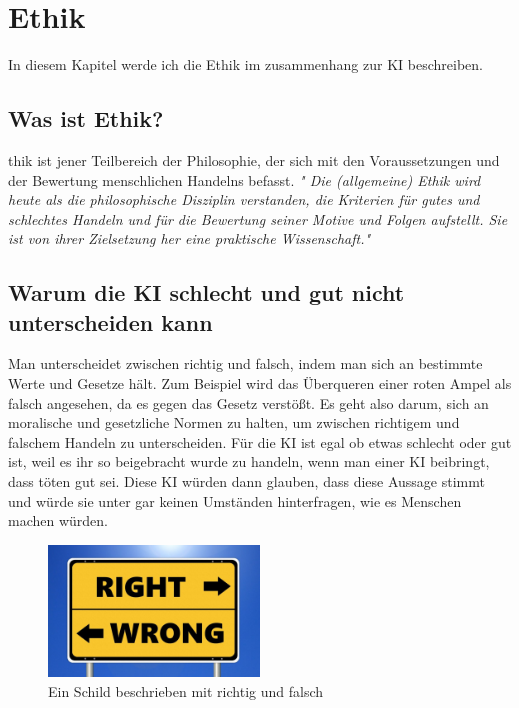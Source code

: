 \chapter{Ethik}
\label{chap:ethics}

In diesem Kapitel werde ich die Ethik im zusammenhang zur KI beschreiben.

\section{Was ist Ethik?}

thik ist jener Teilbereich der Philosophie, der sich mit den Voraussetzungen und der Bewertung menschlichen Handelns befasst. \textit{" Die (allgemeine) Ethik wird heute als die philosophische Disziplin verstanden, die Kriterien für gutes und schlechtes Handeln und für die Bewertung seiner Motive und Folgen aufstellt. Sie ist von ihrer Zielsetzung her eine praktische Wissenschaft." \citep{ethics-wikipedia}}

\section{Warum die KI schlecht und gut nicht unterscheiden kann}

Man unterscheidet zwischen richtig und falsch, indem man sich an bestimmte Werte und Gesetze hält. Zum Beispiel wird das Überqueren einer roten Ampel als falsch angesehen, da es gegen das Gesetz verstößt. Es geht also darum, sich an moralische und gesetzliche Normen zu halten, um zwischen richtigem und falschem Handeln zu unterscheiden. Für die KI ist egal ob etwas schlecht oder gut ist, weil es ihr so beigebracht wurde zu handeln, wenn man einer KI beibringt, dass töten gut sei. Diese KI würden dann glauben, dass diese Aussage stimmt und würde sie unter gar keinen Umständen hinterfragen, wie es Menschen machen würden.

\begin{figure}[h]
    \centering
    \includegraphics[width=0.5\textwidth]{ethics.jpg}
    \caption{Ein Schild beschrieben mit richtig und falsch}
    \label{fig:ethics}
\end{figure}

